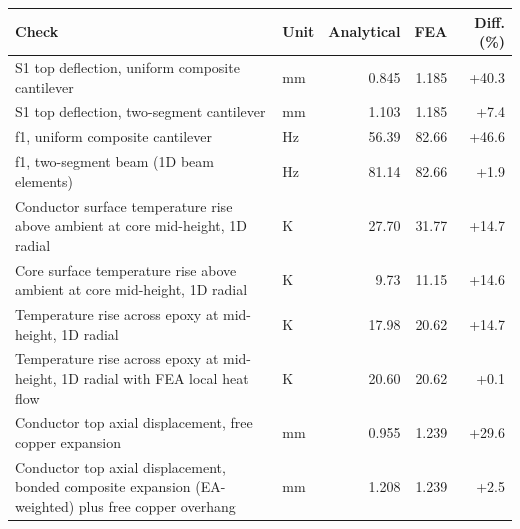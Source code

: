 \begin{tabular}{p{10.2cm}lrrr}
\toprule
Check & Unit & Analytical & FEA & Diff. (\%) \\
\midrule
S1 top deflection, uniform composite cantilever & mm & 0.845 & 1.185 & +40.3 \\
S1 top deflection, two-segment cantilever & mm & 1.103 & 1.185 & +7.4 \\
f1, uniform composite cantilever & Hz & 56.39 & 82.66 & +46.6 \\
f1, two-segment beam (1D beam elements) & Hz & 81.14 & 82.66 & +1.9 \\
Conductor surface temperature rise above ambient at core mid-height, 1D radial & K & 27.70 & 31.77 & +14.7 \\
Core surface temperature rise above ambient at core mid-height, 1D radial & K & 9.73 & 11.15 & +14.6 \\
Temperature rise across epoxy at mid-height, 1D radial & K & 17.98 & 20.62 & +14.7 \\
Temperature rise across epoxy at mid-height, 1D radial with FEA local heat flow & K & 20.60 & 20.62 & +0.1 \\
Conductor top axial displacement, free copper expansion & mm & 0.955 & 1.239 & +29.6 \\
Conductor top axial displacement, bonded composite expansion (EA-weighted) plus free copper overhang & mm & 1.208 & 1.239 & +2.5 \\
\bottomrule
\end{tabular}
